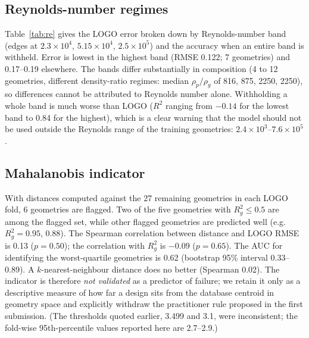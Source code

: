 \documentclass[12pt]{article}
\begin{document}
\subsection{Reynolds-number regimes}
Table~\ref{tab:re} gives the LOGO error broken down by Reynolds-number band (edges at $2.3\times10^4$, $5.15\times10^4$, $2.5\times10^5$) and the accuracy when an entire band is withheld. Error is lowest in the highest band (RMSE 0.122; 7 geometries) and 0.17--0.19 elsewhere. The bands differ substantially in composition (4 to 12 geometries, different density-ratio regimes: median $\rho_p/\rho_g$ of 816, 875, 2250, 2250), so differences cannot be attributed to Reynolds number alone. Withholding a whole band is much worse than LOGO ($R^2$ ranging from $-0.14$ for the lowest band to 0.84 for the highest), which is a clear warning that the model should not be used outside the Reynolds range of the training geometries: $2.4\times10^3$--$7.6\times10^5$.

\begin{table}[!ht]\centering\caption{Reynolds-number bands and LOGO error per band.}\label{tab:re}\end{table}

\subsection{Mahalanobis indicator}
With distances computed against the 27 remaining geometries in each LOGO fold, 6 geometries are flagged. Two of the five geometries with $R^2_g \le 0.5$ are among the flagged set, while other flagged geometries are predicted well (e.g.\ $R^2_g = 0.95$, 0.88). The Spearman correlation between distance and LOGO RMSE is 0.13 ($p = 0.50$); the correlation with $R^2_g$ is $-0.09$ ($p = 0.65$). The AUC for identifying the worst-quartile geometries is 0.62 (bootstrap 95\% interval 0.33--0.89). A $k$-nearest-neighbour distance does no better (Spearman 0.02). The indicator is therefore \emph{not validated} as a predictor of failure; we retain it only as a descriptive measure of how far a design sits from the database centroid in geometry space and explicitly withdraw the practitioner rule proposed in the first submission. (The thresholds quoted earlier, 3.499 and 3.1, were inconsistent; the fold-wise 95th-percentile values reported here are 2.7--2.9.)
\end{document}
